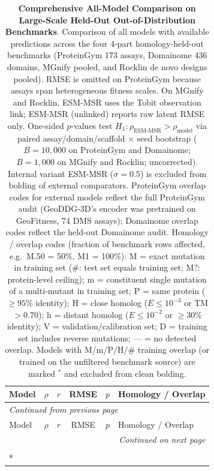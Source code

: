 
{
\scriptsize
\setlength{\tabcolsep}{4pt}
\begin{longtable}{lccccl}
\caption{\textbf{Comprehensive All-Model Comparison on Large-Scale Held-Out Out-of-Distribution Benchmarks}. Comparison of all models with available predictions across the four 4-part homology-held-out benchmarks (ProteinGym 173 assays, Domainome 436 domains, MGnify pooled, and Rocklin de novo designs pooled). RMSE is omitted on ProteinGym because assays span heterogeneous fitness scales. On MGnify and Rocklin, ESM-MSR uses the Tobit observation link; ESM-MSR (unlinked) reports raw latent RMSE only. One-sided $p$-values test $H_1\colon \rho_{\text{ESM-MSR}} > \rho_{\text{model}}$ via paired assay/domain/scaffold $\times$ seed bootstrap ($B=10{,}000$ on ProteinGym and Domainome; $B=1{,}000$ on MGnify and Rocklin; uncorrected). Internal variant ESM-MSR ($\sigma=0.5$) is excluded from bolding of external comparators. ProteinGym overlap codes for external models reflect the full ProteinGym audit (GeoDDG-3D's encoder was pretrained on GeoFitness, 74 DMS assays); Domainome overlap codes reflect the held-out Domainome audit. Homology / overlap codes (fraction of benchmark rows affected, e.g.\ M.50 = 50\%, M1 = 100\%): M = exact mutation in training set (\#: test set equals training set; M?: protein-level ceiling); m = constituent single mutation of a multi-mutant in training set; P = same protein ($\ge 95\%$ identity); H = close homolog ($E\le 10^{-3}$ or TM $>0.70$); h = distant homolog ($E\le 10^{-2}$ or $\ge 30\%$ identity); V = validation/calibration set; D = training set includes reverse mutations; --- = no detected overlap. Models with M/m/P/H/\# training overlap (or trained on the unfiltered benchmark source) are marked $^*$ and excluded from clean bolding.}\label{tab:si_heldout_ood} \\
\toprule
Model & $\rho$ & $r$ & RMSE & $p$ & Homology / Overlap \\
\midrule
\endfirsthead
\multicolumn{6}{l}{\textit{Continued from previous page}} \\
\toprule
Model & $\rho$ & $r$ & RMSE & $p$ & Homology / Overlap \\
\midrule
\endhead
\midrule
\multicolumn{6}{r}{\textit{Continued on next page}} \\
\endfoot
\bottomrule
\endlastfoot
\multicolumn{6}{l}{\textbf{ProteinGym (173 held-out DMS assays; $n=2{,}351{,}490$; category-weighted macro average)}} \\*

\end{longtable}}
